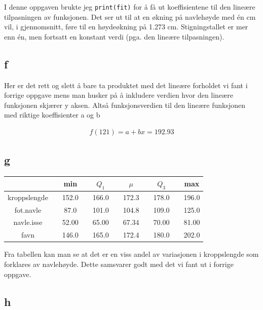 I denne oppgaven brukte jeg \texttt{print(fit)} for å få ut koeffisientene til den lineære tilpasningen av funksjonen. Det ser ut til at en økning på navlehøyde med én cm vil, i gjennomsnitt, føre til en høydeøkning på 1.273 cm. Stigningstallet er mer enn én, men fortsatt en konstant verdi (pga. den lineære tilpasningen).

\subsection*{f}
Her er det rett og slett å bare ta produktet med det lineære forholdet vi fant i forrige oppgave mens man husker på å inkludere verdien hvor den lineære funksjonen skjærer y aksen. Altså funksjonsverdien til den lineære funksjonen med riktige koeffisienter a og b

\begin{align*}
    f(121)= a + bx = 192.93
\end{align*}

\subsection*{g}

\begin{center}
\label{tab:summary2}
\begin{tabularx}{\textwidth}{c X c X c X c X c X c }
    \hline
    \hline
         && min && $Q_1$ && $\mu$ && $Q_3$ && max \\
    \hline
    kroppslengde    && 152.0 && 166.0 && 172.3 && 178.0 && 196.0 \\
    fot.navle       &&  87.0 && 101.0 && 104.8 && 109.0 && 125.0 \\
    navle.isse      && 52.00 && 65.00 && 67.34 && 70.00 && 81.00 \\
    favn            && 146.0 && 165.0 && 172.4 && 180.0 && 202.0 \\

    \hline
\end{tabularx}
\end{center}
Fra tabellen kan man se at det er en viss andel av variasjonen i kroppslengde som forklares av navlehøyde. Dette samsvarer godt med det vi fant ut i forrige oppgave. 

\subsection*{h}

